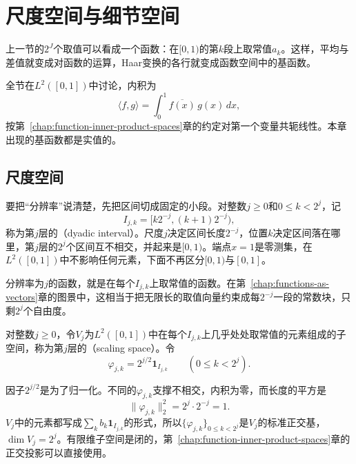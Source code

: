 \section{尺度空间与细节空间}
\label{sec:wavelet-scaling-detail}

上一节的$2^J$个取值可以看成一个函数：在$[0,1)$的第$k$段上取常值$a_k$。这样，平均与差值就变成对函数的运算，Haar变换的各行就变成函数空间中的基函数。

全节在$L^2([0,1])$中讨论，内积为
\[
 \langle f,g\rangle=\int_0^1\overline{f(x)}\,g(x)\,dx,
\]
按第~\ref{chap:function-inner-product-spaces}章的约定对第一个变量共轭线性。本章出现的基函数都是实值的。

\subsection{尺度空间}
\label{sec:wavelet-scaling-spaces}

要把“分辨率”说清楚，先把区间切成固定的小段。对整数$j\geq0$和$0\leq k<2^j$，记
\begin{equation}
 I_{j,k}=\bigl[k2^{-j},(k+1)2^{-j}\bigr),
 \label{eq:wavelet-dyadic-interval}
\end{equation}
称为第$j$层的（dyadic interval）。尺度$j$决定区间长度$2^{-j}$，位置$k$决定区间落在哪里，第$j$层的$2^j$个区间互不相交，并起来是$[0,1)$。端点$x=1$是零测集，在$L^2([0,1])$中不影响任何元素，下面不再区分$[0,1)$与$[0,1]$。

分辨率为$j$的函数，就是在每个$I_{j,k}$上取常值的函数。在第~\ref{chap:functions-as-vectors}章的图景中，这相当于把无限长的取值向量约束成每$2^{-j}$一段的常数块，只剩$2^j$个自由度。

\begin{definition}[Haar尺度空间]
\label{def:wavelet-scaling-space}
对整数$j\geq0$，令$V_j$为$L^2([0,1])$中在每个$I_{j,k}$上几乎处处取常值的元素组成的子空间，称为第$j$层的（scaling space）。令
\begin{equation}
 \varphi_{j,k}=2^{j/2}\mathbf{1}_{I_{j,k}}\qquad(0\leq k<2^j).
 \label{eq:wavelet-scaling-basis}
\end{equation}
\end{definition}

因子$2^{j/2}$是为了归一化。不同的$\varphi_{j,k}$支撑不相交，内积为零，而长度的平方是
\[
 \lVert\varphi_{j,k}\rVert_2^2=2^j\cdot2^{-j}=1.
\]
$V_j$中的元素都写成$\sum_kb_k\mathbf{1}_{I_{j,k}}$的形式，所以$\{\varphi_{j,k}\}_{0\leq k<2^j}$是$V_j$的标准正交基，$\dim V_j=2^j$。有限维子空间是闭的，第~\ref{chap:function-inner-product-spaces}章的正交投影可以直接使用。

